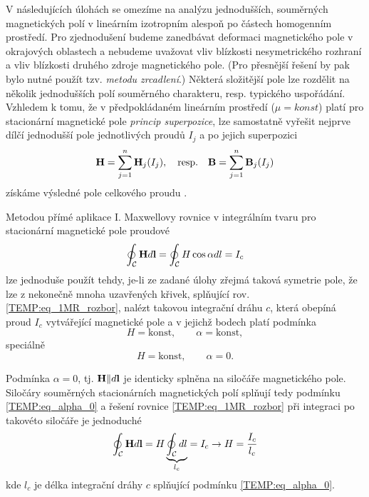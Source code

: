     V následujících úlohách se omezíme na analýzu jednodušších, souměrných magnetických polí v 
    lineárním izotropním alespoň po částech homogenním prostředí. Pro zjednodušení budeme 
    zanedbávat deformaci magnetického pole v okrajových oblastech a nebudeme uvažovat vliv 
    blízkosti nesymetrického rozhraní a vliv blízkosti druhého zdroje magnetického pole. (Pro 
    přesnější řešení by pak bylo nutné použít tzv. \emph{metodu zrcadlení}.) Některá složitější 
    pole lze rozdělit na několik jednodušších polí souměrného charakteru, resp. typického 
    uspořádání. Vzhledem k tomu, že v předpokládaném lineárním prostředí ($\mu 
    = konst$) platí pro stacionární magnetické pole \emph{princip superpozice}, lze samostatně 
    vyřešit nejprve dílčí jednodušší pole jednotlivých proudů $I_j$ a po jejich superpozici
      \begin{equation}\label{TEMP:eq_superp_mag_pole}
        \mathbf{H}= \sum_{j=1}^n\mathbf{H}_j(I_j), \quad\text{resp.}\quad \mathbf{B}= 
        \sum_{j=1}^n\mathbf{B}_j(I_j)   
      \end{equation}
    získáme výsledné pole celkového proudu \cite[s.~181]{Kotlan1999}. 
    
    Metodou přímé aplikace I. Maxwellovy rovnice v integrálním tvaru pro stacionární magnetické
    pole proudové
      \begin{equation}\label{TEMP:eq_1MR_rozbor}
        \oint_{\mathcal{C}}\mathbf{H}d\mathbf{l} = \oint_{\mathcal{C}}H\cos\alpha dl = I_c
      \end{equation}    
    lze jednoduše použít tehdy, je-li ze zadané úlohy zřejmá taková symetrie pole, že lze z 
    nekonečně mnoha uzavřených křivek, splňující rov. \ref{TEMP:eq_1MR_rozbor}, nalézt takovou 
    integrační dráhu $c$, která obepíná proud $I_c$ vytvářející magnetické pole a v jejichž bodech 
    platí podmínka
      \begin{equation}\label{TEMP:eq_H_alpha_konst}
        H = \text{konst}, \qquad \alpha = \text{konst},
      \end{equation}    
    speciálně
      \begin{equation}\label{TEMP:eq_alpha_0}
        H = \text{konst}, \qquad \alpha = 0.
      \end{equation}
    
    Podmínka $\alpha = 0$, tj. $\mathbf{H}\| d\mathbf{l}$ je identicky splněna na siločáře magnetického 
    pole. Siločáry souměrných stacionárních magnetických polí splňují tedy podmínku 
    \ref{TEMP:eq_alpha_0} a řešení rovnice \ref{TEMP:eq_1MR_rozbor} při integraci po takovéto 
    siločáře je jednoduché
      \begin{equation}\label{TEMP:eq_1MR_alpha0}
        \oint_{\mathcal{C}}\mathbf{H}d\mathbf{l} = H\underbrace{\oint_{\mathcal{C}} dl}_{l_c} = 
                                         I_c \rightarrow H = \frac{I_c}{l_c}
      \end{equation}
    kde $l_c$ je délka integrační dráhy $c$ splňující podmínku \ref{TEMP:eq_alpha_0}.
      

